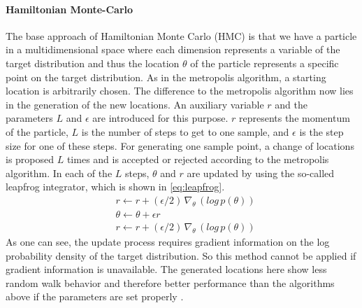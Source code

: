 \documentclass{article}
\begin{document}
\paragraph{Hamiltonian Monte-Carlo}
The base approach of Hamiltonian Monte Carlo (HMC) is that we have a particle in a multidimensional space where each dimension represents a variable of the target distribution and thus the location $\theta$ of the particle represents a specific point on the target distribution. As in the metropolis algorithm, a starting location is arbitrarily chosen. The difference to the metropolis algorithm now lies in the generation of the new locations. An auxiliary variable $r$ and the parameters $L$ and $\epsilon$ are introduced for this purpose. $r$ represents the momentum of the particle, $L$ is the number of steps to get to one sample, and $\epsilon$ is the step size for one of these steps. For generating one sample point, a change of locations is proposed $L$ times and is accepted or rejected according to the metropolis algorithm. In each of the $L$ steps, $\theta$ and $r$ are updated by using the so-called leapfrog integrator, which is shown in \autoref{eq:leapfrog}. 
\begin{equation}
\begin{split}
\label{eq:leapfrog}
&r \leftarrow r + (\epsilon/2)  \, \nabla_\theta \, (log \, p(\theta))\\
&\theta \leftarrow \theta + \epsilon r\\
&r \leftarrow r + (\epsilon/2) \, \nabla_\theta \, (log \, p(\theta))
\end{split}
\end{equation}
As one can see, the update process requires gradient information on the log probability density of the target distribution. So this method cannot be applied if gradient information is unavailable. The generated locations here show less random walk behavior and therefore better performance than the algorithms above if the parameters are set properly \cite{hoffman2014no}.

\end{document}
